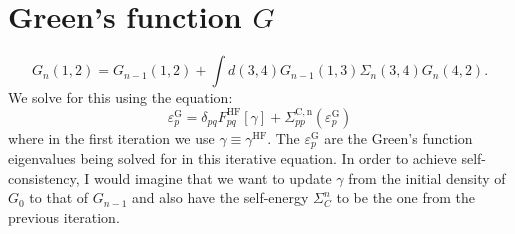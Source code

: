 \documentclass[12pt]{article}
\begin{document}
\section{Green's function $G$}
\begin{equation}
    G_n(1,2)=G_{n-1}(1,2)+\int d(3,4) G_{n-1}(1,3) \Sigma_n(3,4) G_n(4,2).
\end{equation}
We solve for this using the equation:
\begin{equation}
    \varepsilon_{p}^{\mathrm{G}} = \delta_{pq}F_{pq}^{\mathrm{HF}}[\gamma] + \Sigma_{pp}^{\mathrm{C,n}}(\varepsilon_{p}^{\mathrm{G}})
\label{eq: Iterative equation}
\end{equation}
where in the first iteration we use $\gamma \equiv \gamma^{\mathrm{HF}}$. The $\varepsilon_{p}^{\mathrm{G}}$ are the Green's function eigenvalues being solved for in this iterative equation. In order to achieve self-consistency, I would imagine that we want to update $\gamma$ from the initial density of $G_0$ to that of $G_{n-1}$ and also have the self-energy $\Sigma_C^n$ to be the one from the previous iteration.
\end{document}
